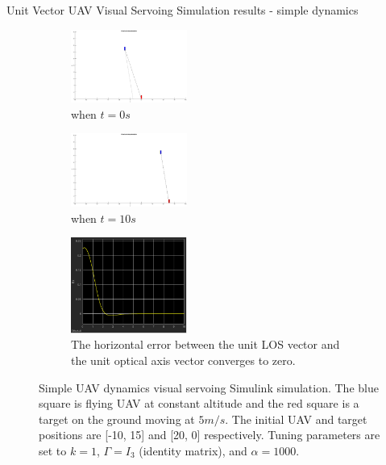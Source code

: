\documentclass[9pt]{beamer}
\begin{document}
\begin{frame}{Unit Vector UAV Visual Servoing}
Simulation results - simple dynamics
\begin{figure}[htbp]
	\centering
	\begin{subfigure}[t]{0.32\linewidth}
		\includegraphics[width=1.5in]{chapter4/simple_zero}
		\caption{when $t=0s$}
	\end{subfigure}
	\begin{subfigure}[t]{0.32\linewidth}
		\includegraphics[width=1.5in]{chapter4/simple_ten}
		\caption{when $t=10s$}
	\end{subfigure}
	\begin{subfigure}[t]{0.32\linewidth}
		\centering
		\includegraphics[width=1.5in]{chapter4/simple_ex}
		\caption{The horizontal error between the unit LOS vector and the unit optical axis vector converges to zero.}
	\end{subfigure}	
	\caption{Simple UAV dynamics visual servoing Simulink simulation. The blue square is flying UAV at constant altitude and the red square is a target on the ground moving at $5m/s$. The initial UAV and target positions are [-10, 15] and [20, 0] respectively. Tuning parameters are set to $k=1$, $\Gamma=I_3$ (identity matrix), and $\alpha=1000$.}
	\label{simple_simulation}
\end{figure}
\end{frame}
\end{document}
